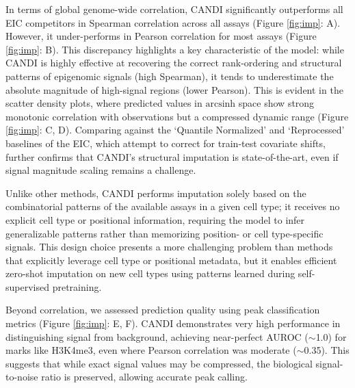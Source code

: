 In terms of global genome-wide correlation, CANDI significantly outperforms all EIC competitors in Spearman correlation across all assays (Figure \ref{fig:imp}: A). However, it under-performs in Pearson correlation for most assays  (Figure \ref{fig:imp}: B). This discrepancy highlights a key characteristic of the model: while CANDI is highly effective at recovering the correct rank-ordering and structural patterns of epigenomic signals (high Spearman), it tends to underestimate the absolute magnitude of high-signal regions (lower Pearson). This is evident in the scatter density plots, where predicted values in $\text{arcsinh}$ space show strong monotonic correlation with observations but a compressed dynamic range (Figure \ref{fig:imp}: C, D). Comparing against the `Quantile Normalized' and `Reprocessed' baselines of the EIC, which attempt to correct for train-test covariate shifts, further confirms that CANDI's structural imputation is state-of-the-art, even if signal magnitude scaling remains a challenge.

Unlike other methods, CANDI performs imputation solely based on the combinatorial patterns of the available assays in a given cell type; it receives no explicit cell type or positional information, requiring the model to infer generalizable patterns rather than memorizing position- or cell type-specific signals. This design choice presents a more challenging problem than methods that explicitly leverage cell type or positional metadata, but it enables efficient zero-shot imputation on new cell types using patterns learned during self-supervised pretraining.

Beyond correlation, we assessed prediction quality using peak classification metrics (Figure \ref{fig:imp}: E, F). CANDI demonstrates very high performance in distinguishing signal from background, achieving near-perfect AUROC ($\sim$1.0) for marks like H3K4me3, even where Pearson correlation was moderate ($\sim$0.35). This suggests that while exact signal values may be compressed, the biological signal-to-noise ratio is preserved, allowing accurate peak calling.




